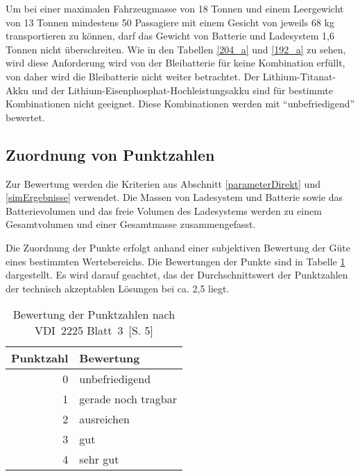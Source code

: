 Um bei einer maximalen Fahrzeugmasse von 18 Tonnen und einem Leergewicht von 13 Tonnen mindestens 50 Passagiere mit einem Gesicht von jeweils 68 kg transportieren zu können, darf das Gewicht von Batterie und Ladesystem 1,6 Tonnen nicht überschreiten. Wie in den Tabellen \ref{204_a} und \ref{192_a} zu sehen, wird diese Anforderung wird von der Bleibatterie für keine Kombination erfüllt, von daher wird die Bleibatterie nicht weiter betrachtet. Der Lithium-Titanat-Akku und der Lithium-Eisenphosphat-Hochleistungsakku sind für bestimmte Kombinationen nicht geeignet. Diese Kombinationen werden mit "`unbefriedigend"' bewertet.

\subsection{Zuordnung von Punktzahlen}
Zur Bewertung werden die Kriterien aus Abschnitt \ref{parameterDirekt} und \ref{simErgebnisse} verwendet. Die Massen von Ladesystem und Batterie sowie das Batterievolumen und das freie Volumen des Ladesystems werden zu einem Gesamtvolumen und einer Gesamtmasse zusammengefasst.

Die Zuordnung der Punkte erfolgt anhand einer subjektiven Bewertung der Güte eines bestimmten Wertebereichs. Die Bewertungen der Punkte sind in Tabelle \ref{tabPunkte} dargestellt. Es wird darauf geachtet, das der Durchschnittswert der Punktzahlen der technisch akzeptablen Lösungen bei ca. 2,5 liegt.

\begin{table} \centering
	\begin{tabular}{rl}
		\toprule
		Punktzahl & Bewertung           \\ \midrule
		        0 & unbefriedigend      \\
		        1 & gerade noch tragbar \\
		        2 & ausreichen          \\
		        3 & gut                 \\
		        4 & sehr gut            \\ \bottomrule
	\end{tabular}
	\caption[Bewertung der Punktzahlen]{Bewertung der Punktzahlen nach VDI~2225 Blatt~3~\cite{vdi:2225}[S. 5]}
	\label{tabPunkte}
\end{table}

